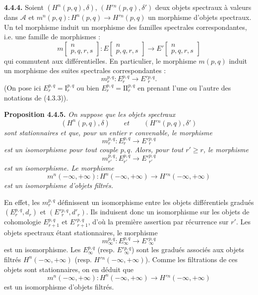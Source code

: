 \clearpage
{}%
\begingroup\small\setlength{\parskip}{0pt}\setlength{\emergencystretch}{1.5em}
\medskip\noindent\textbf{4.4.4.}\quad
Soient $(H^n(p,q),\delta)$, $(H'{}^n(p,q),\delta')$ deux objets spectraux à
  valeurs dans $\mathcal A$ et
  $m^n(p,q)\colon\allowbreak H^n(p,q)\longrightarrow\allowbreak H'{}^n(p,q)$ un morphisme d'objets
spectraux. Un tel morphisme induit un morphisme des familles spectrales
correspondantes, i.e. une famille de morphismes :
\[
m\!\left[\begin{smallmatrix}n\\p,q,r,s\end{smallmatrix}\right]
\colon
E\!\left[\begin{smallmatrix}n\\p,q,r,s\end{smallmatrix}\right]
\longrightarrow
E'\!\left[\begin{smallmatrix}n\\p,q,r,s\end{smallmatrix}\right]
\]
qui commutent aux différentielles. En particulier, le morphisme $m(p,q)$
induit un morphisme des suites spectrales correspondantes :
\[
m_r^{p,q}\colon E_r^{p,q}\longrightarrow E'{}_{r}^{p,q}.
\]
(On pose ici $E_r^{p,q}=\mathrm I_r^{p,q}$ ou bien
$E_r^{p,q}=\mathrm{II}_r^{p,q}$ en prenant l'une ou l'autre des notations de
(4.3.3)).

\medskip\noindent\textbf{Proposition 4.4.5.}\quad
\textit{On suppose que les objets spectraux}
\[
(H^n(p,q),\delta)
\qquad\textit{et}\qquad
(H'{}^n(p,q),\delta')
\]
\textit{sont stationnaires et que, pour un entier $r$ convenable, le
morphisme}
\[
m_r^{p,q}\colon E_r^{p,q}\longrightarrow E'{}_{r}^{p,q}
\]
\textit{est un isomorphisme pour tout couple $p,q$. Alors, pour tout
$r'\geq r$, le morphisme}
\[
m_{r'}^{p,q}\colon E_{r'}^{p,q}\longrightarrow E'{}_{r'}^{p,q}
\]
\textit{est un isomorphisme. Le morphisme}
\[
m^n(-\infty,+\infty)\colon H^n(-\infty,+\infty)
\longrightarrow H'{}^n(-\infty,+\infty)
\]
\textit{est un isomorphisme d'objets filtrés.}

En effet, les $m_r^{p,q}$ définissent un isomorphisme entre les objets
différentiels gradués $(E_r^{p,q},d_r)$ et $(E'{}_{r}^{p,q},d'_r)$. Ils
induisent donc un isomorphisme sur les objets de cohomologie
$E_{r+1}^{p,q}$ et $E'{}_{r+1}^{p,q}$, d'où la première assertion par
récurrence sur $r'$. Les objets spectraux étant stationnaires, le morphisme
\[
m_\infty^{p,q}\colon E_\infty^{p,q}\longrightarrow
E'{}_{\infty}^{p,q}
\]
est un isomorphisme. Les $E_\infty^{p,q}$ (resp. $E'{}_{\infty}^{p,q}$) sont
les gradués associés aux objets filtrés $H^n(-\infty,+\infty)$ (resp.
$H'{}^n(-\infty,+\infty)$). Comme les filtrations de ces objets sont
stationnaires, on en déduit que
\[
m^n(-\infty,+\infty)\colon H^n(-\infty,+\infty)
\longrightarrow H'{}^n(-\infty,+\infty)
\]
est un isomorphisme d'objets filtrés.
\endgroup
